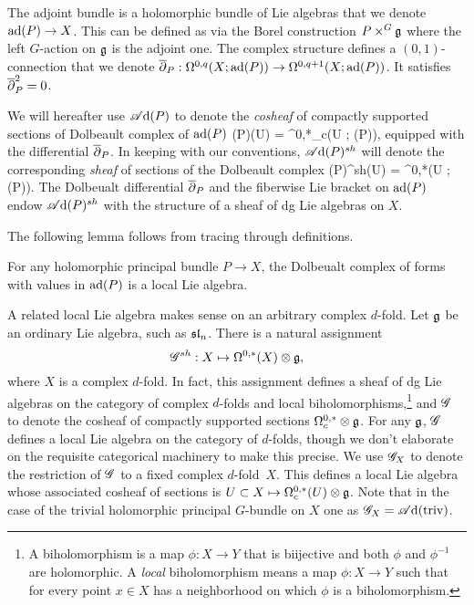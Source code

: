 \documentclass[10pt]{amsart}
\def\sAd{\sA{\rm d}}
\begin{document}
The adjoint bundle is a holomorphic bundle of Lie algebras that we denote ${\rm ad}(P) \to X$.
This can be defined as via the Borel construction $P \times^{G} \mathfrak g$ where the left $G$-action on $\mathfrak g$ is the adjoint one. 
The complex structure defines a $(0,1)$-connection that we denote $\overline{\partial}_P : \Omega^{0,q}(X ; {\rm ad}(P)) \to \Omega^{0,q+1}(X ; {\rm ad}(P))$. 
It satisfies $\overline{\partial}_P^2 = 0$.

We will hereafter use $\sAd(P)$ to denote the {\em cosheaf} of compactly supported sections of Dolbeault complex of ${\rm ad}(P)$
\ben
\sAd(P)(U) = \Omega^{0,*}_c(U ; \ad(P)),
\een
equipped with the differential $\overline{\partial}_P$. 
In keeping with our conventions, $\sAd(P)^{sh}$ will denote the corresponding {\em sheaf} of sections of the Dolbeault complex 
\ben
\sAd(P)^{sh}(U) = \Omega^{0,*}(U ; \ad(P)).
\een
The Dolbeualt differential $\overline{\partial}_P$ and the fiberwise Lie bracket on ${\rm ad}(P)$ endow $\sAd(P)^{sh}$ with the structure of a sheaf of dg Lie algebras on $X$.

The following lemma follows from tracing through definitions. 

\begin{lem} For any holomorphic principal bundle $P \to X$, the Dolbeualt complex of forms with values in ${\rm ad}(P)$ is a local Lie algebra. 
\end{lem}

\begin{eg}
A related local Lie algebra makes sense on an arbitrary complex $d$-fold.
Let $\mathfrak g$ be an ordinary Lie algebra, such as ${\frak{s}\frak{l}}_n$.
There is a natural assignment 
\[
\mathscr G^{sh} : X \mapsto \Omega^{0,*}(X) \otimes \mathfrak g,
\]
where $X$ is a complex $d$-fold.
In fact, this assignment defines a sheaf of dg Lie algebras on the category of complex $d$-folds and local biholomorphisms,\footnote{A biholomorphism is a map $\phi: X \to Y$ that is biijective and both $\phi$ and $\phi^{-1}$ are holomorphic. A {\em local} biholomorphism means a map $\phi: X \to Y$ such that for every point $x \in X$ has a neighborhood on which $\phi$ is a biholomorphism.}
and $\mathscr G$ to denote the cosheaf of compactly supported sections $\Omega^{0,*}_c \otimes \mathfrak g$.
For any $\mathfrak g$, $\mathscr G$ defines a local Lie algebra on the category of $d$-folds, though we don't elaborate on the requisite categorical machinery to make this precise.
We use $\mathscr G_X$ to denote the restriction of $\mathscr G$ to a fixed complex $d$-fold~$X$.
This defines a local Lie algebra whose associated cosheaf of sections is $U \subset X \mapsto \Omega^{0,*}_c(U) \otimes \mathfrak g$.
Note that in the case of the trivial holomorphic principal $G$-bundle on $X$ one as $\sG_X = \sAd({\rm triv})$. 
\end{eg}
 
\end{document}
